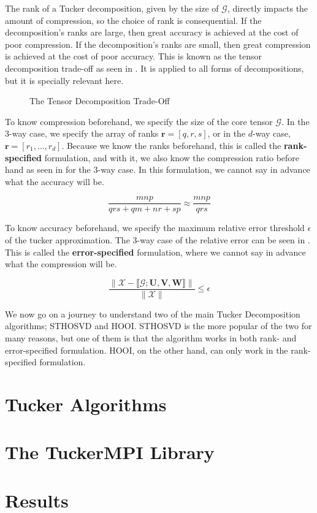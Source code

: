 
The rank of a Tucker decomposition, given by the size of $\mathcal{G}$, directly
impacts the amount of compression, so the choice of rank is consequential. If
the decomposition's ranks are large, then great accuracy is achieved at the cost
of poor compression. If the decomposition's ranks are small, then great
compression is achieved at the cost of poor accuracy. This is known as the
tensor decomposition trade-off as seen in
. It is applied to all forms of
decompositions, but it is specially relevant here. 

\begin{figure}[ht!]
    \centering
    
    \caption{The Tensor Decomposition Trade-Off}
    \label{fig:tensor_decomposition_trade_off}
\end{figure}

To know compression beforehand, we specify the size of the core tensor
$\mathcal{G}$. In the 3-way case, we specify the array of ranks $\mathbf{r} =
[q, r, s]$, or in the $d$-way case, $\mathbf{r} = [r_1, \hdots, r_d]$. Because
we know the ranks beforehand, this is called the \textbf{rank-specified}
formulation, and with it, we also know the compression ratio before hand as seen
in  for the 3-way case. In this formulation, we
cannot say in advance what the accuracy will be.

\begin{equation} \label{eq:compression_ratio}
    \frac{mnp}{qrs + qm + nr + sp} \approx \frac{mnp}{qrs}
\end{equation}

To know accuracy beforehand, we specify the maximum relative error threshold
$\epsilon$ of the tucker approximation. The 3-way case of the relative error can
be seen in . This is called the \textbf{error-specified}
formulation, where we cannot say in advance what the compression will be. 

\begin{equation} \label{eq:rel_error}
    \frac{\| \mathcal{X} - \llbracket \mathcal{G}; \mathbf{U, V, W} \rrbracket \|}{\|\mathcal{X}\|} \leq \epsilon
\end{equation}

We now go on a journey to understand two of the main Tucker Decomposition
algorithms; STHOSVD and HOOI. STHOSVD is the more popular of the two for many
reasons, but one of them is that the algorithm works in both rank- and
error-specified formulation. HOOI, on the other hand, can only work in the
rank-specified formulation. 


\section{Tucker Algorithms} \label{sec:Tucker Algorithms}
    

\section{The TuckerMPI Library}
    

\section{Results}
    